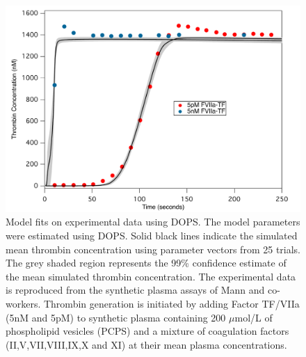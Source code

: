 \documentclass[12pt]{article}
\begin{document}
\begin{figure}[h]
\centering
\includegraphics[width=1.0\textwidth]{./figs/Figure_5_Sim_Train_E1_E5.pdf}
\caption{Model fits on experimental data using DOPS. The model parameters were estimated using DOPS. Solid black lines indicate the simulated mean thrombin concentration using parameter vectors from 25 trials. The grey shaded region represents the 99\% confidence estimate of the mean simulated thrombin concentration. The experimental data is reproduced from the synthetic plasma assays of Mann and co-workers. Thrombin generation is initiated by adding Factor TF/VIIa (5nM and 5pM) to synthetic plasma containing 200 $\mu$mol/L of phospholipid vesicles (PCPS) and a mixture of coagulation factors (II,V,VII,VIII,IX,X and XI) at their mean plasma concentrations.
}\label{fig-train}
\end{figure}

\clearpage
\end{document}
